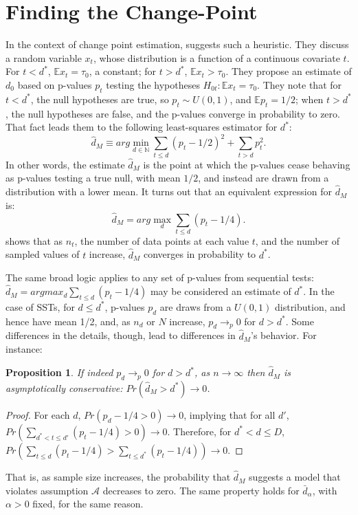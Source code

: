 \documentclass[sts]{imsart}\usepackage[]{graphicx}\usepackage[]{color}
\newcommand{\dalphaU}{\bar{d}_\alpha}
\newcommand{\dstar}{d^*}
\newcommand{\dhatm}{\hat{d}_M}
\newcommand{\EE}{\mathbb{E}}
\newtheorem{prop}{Proposition}
\begin{document}
\section{Finding the Change-Point}\label{sec:change-point}
In the context of change point estimation, \citet{mallik} suggests
such a heuristic.
They discuss a random variable $x_t$, whose distribution is a function
of a continuous covariate $t$.
For $t<d^*$, $\EE x_t=\tau_0$, a constant; for $t>\dstar$, $\EE
x_t>\tau_0$.
They propose an estimate of $d_0$ based on p-values $p_t$
testing the hypotheses $H_{0t}:\EE x_t=\tau_0$.
They note that for $t<\dstar$, the null hypotheses are true, so
$p_t\sim U(0,1)$, and $\EE p_t =1/2$; when $t>\dstar$, the null hypotheses are false, and
the p-values converge in probability to zero.
That fact leads them to the following least-squares estimator for
$\dstar$:
\begin{equation*}
\dhatm\equiv arg\displaystyle\min_{d\in \mathbb{N}} \displaystyle\sum_{t\le d} (p_t -1/2)^2 +
\displaystyle\sum_{t>d} p_t^2.
\end{equation*}
In other words, the estimate $\dhatm$ is the point at which the
p-values cease behaving as p-values testing a true null, with mean
$1/2$, and instead are drawn from a distribution with a lower mean.
It turns out that an equivalent expression for $\dhatm$ is:
\begin{equation}\label{eq:mallikSimple}
\dhatm=arg\displaystyle\max_d \displaystyle\sum_{t\le d} (p_t-1/4).
\end{equation}
\citet{mallik} shows that as $n_t$, the number of data points at each value
$t$, and the number of sampled values of $t$ increase, $\dhatm$
converges in probability to $\dstar$.

The same broad logic applies to any set of p-values from sequential tests:
$\dhatm=argmax_d \sum_{t\le d} (p_t-1/4)$ may be considered an
estimate of $\dstar$.
In the case of SSTs, for $d\le \dstar$, p-values $p_d$ are draws from
a $U(0,1)$ distribution, and hence have mean 1/2, and, as $n_d$ or $N$
increase, $p_d \rightarrow_p 0$ for $d>\dstar$.
Some differences in the details, though, lead to differences in
$\dhatm$'s behavior.
For instance:
\begin{prop}
If indeed $p_d\rightarrow_p 0$ for $d>\dstar$, as $n\rightarrow\infty$ then $\dhatm$ is asymptotically conservative:
$Pr(\dhatm>\dstar)\rightarrow 0$.
\end{prop}
\begin{proof}
For each $d$, $Pr(p_d -1/4>0)\rightarrow 0$, implying that for all $d'$, $Pr(\sum_{\dstar <t\le d'}
(p_t-1/4)>0)\rightarrow 0$.
Therefore, for $\dstar<d\le D$, $Pr(\sum_{t\le d} (p_t-1/4)> \sum_{t\le
  \dstar} (p_t-1/4))\rightarrow 0$.
\end{proof}
That is, as sample size increases, the probability that $\dhatm$
suggests a model that violates assumption $\mathcal{A}$ decreases to
zero.
The same property holds for $\dalphaU$, with $\alpha>0$ fixed, for
the same reason.
\end{document}
